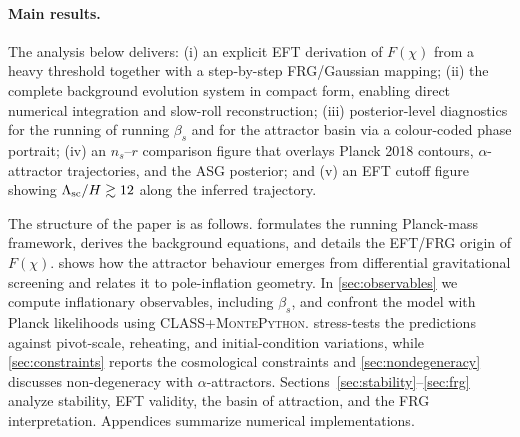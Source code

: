 \documentclass[11pt,a4paper]{article}
\begin{document}
\paragraph{Main results.} The analysis below delivers: (i) an explicit EFT derivation of $F(\chi)$ from a heavy threshold together with a step-by-step FRG/Gaussian mapping; (ii) the complete background evolution system in compact form, enabling direct numerical integration and slow-roll reconstruction; (iii) posterior-level diagnostics for the running of running $\beta_s$ and for the attractor basin via a colour-coded phase portrait; (iv) an $n_s$--$r$ comparison figure that overlays Planck 2018 contours, $\alpha$-attractor trajectories, and the ASG posterior; and (v) an EFT cutoff figure showing $\Lambda_{\rm sc}/H \gtrsim 12$ along the inferred trajectory.

The structure of the paper is as follows.  formulates the running Planck-mass framework, derives the background equations, and details the EFT/FRG origin of $F(\chi)$.  shows how the attractor behaviour emerges from differential gravitational screening and relates it to pole-inflation geometry. In \cref{sec:observables} we compute inflationary observables, including $\beta_s$, and confront the model with Planck likelihoods using \textsc{CLASS}+\textsc{MontePython}.  stress-tests the predictions against pivot-scale, reheating, and initial-condition variations, while \cref{sec:constraints} reports the cosmological constraints and \cref{sec:nondegeneracy} discusses non-degeneracy with $\alpha$-attractors. Sections~\ref{sec:stability}--\ref{sec:frg} analyze stability, EFT validity, the basin of attraction, and the FRG interpretation. Appendices summarize numerical implementations.
\end{document}
